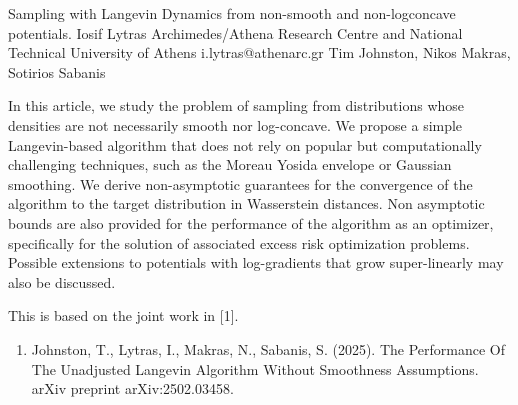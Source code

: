 \begin{talk}
  {Sampling with Langevin Dynamics from non-smooth and non-logconcave potentials.}
  {Iosif Lytras}
  {Archimedes/Athena Research Centre and National Technical University of Athens}%
  {i.lytras@athenarc.gr}%
  {Tim Johnston, Nikos Makras, Sotirios Sabanis}  %
  
    
   
In this article, we study the problem of sampling from distributions whose densities are not necessarily smooth nor log-concave. We propose a simple Langevin-based algorithm that does not rely on popular but computationally challenging techniques, such as the Moreau Yosida envelope or Gaussian smoothing. We derive non-asymptotic guarantees for the convergence of the algorithm to the target distribution in Wasserstein distances. Non asymptotic bounds are also provided for the performance of the algorithm as an optimizer, specifically for the solution of associated excess risk optimization problems.\\
Possible extensions to potentials with log-gradients that grow super-linearly may also be discussed.

This is based on the joint work in [1].
\medskip

\begin{enumerate}
    \item [{[1]}] Johnston, T., Lytras, I., Makras, N., Sabanis, S. (2025). The Performance Of The Unadjusted Langevin Algorithm Without Smoothness Assumptions. arXiv preprint arXiv:2502.03458.
\end{enumerate}
\end{talk}

